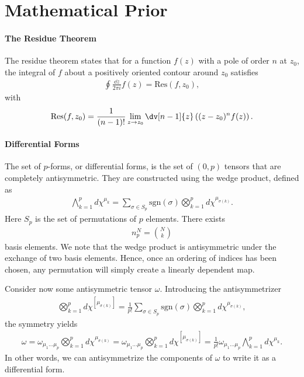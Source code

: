 \section{Mathematical Prior}

\paragraph{The Residue Theorem}
The residue theorem states that for a function $f(z)$ with a pole of order $n$ at $z_{0}$, the integral of $f$ about a positively oriented contour around $z_{0}$ satisfies
\begin{align*}
	\oint\frac{\dd{z}}{2\pi i}f(z) = \text{Res}(f, z_{0}),
\end{align*}
with
\begin{align*}
	\text{Res}(f, z_{0}) = \frac{1}{(n - 1)!}\lim\limits_{z\to z_{0}}\dv[n - 1]{z}\left((z - z_{0})^{n}f(z)\right).
\end{align*}

\paragraph{Differential Forms}
The set of $p$-forms, or differential forms, is the set of $(0, p)$ tensors that are completely antisymmetric. They are constructed using the wedge product, defined as
\begin{align*}
	\bigwedge\limits_{k = 1}^{p}d\chi^{\mu_{k}} = \sum\limits_{\sigma\in S_{p}}\text{sgn}(\sigma)\bigotimes_{k = 1}^{p}d\chi^{\mu_{\sigma(k)}}.
\end{align*}
Here $S_{p}$ is the set of permutations of $p$ elements. There exists
\begin{align*}
	n_{p}^{N} = {N\choose k}
\end{align*}
basis elements. We note that the wedge product is antisymmetric under the exchange of two basis elements. Hence, once an ordering of indices has been chosen, any permutation will simply create a linearly dependent map.

Consider now some antisymmetric tensor $\omega$. Introducing the antisymmetrizer
\begin{align*}
	\bigotimes_{k = 1}^{p}d\chi^{[\mu_{\sigma(k)}]} = \frac{1}{p!}\sum\limits_{\sigma\in S_{p}}\text{sgn}(\sigma)\bigotimes_{k = 1}^{p}d\chi^{\mu_{\sigma(k)}},
\end{align*}
the symmetry yields
\begin{align*}
	\omega = \omega_{\mu_{1}\dots \mu_{p}}\bigotimes_{k = 1}^{p}d\chi^{\mu_{\sigma(k)}} = \omega_{\mu_{1}\dots \mu_{p}}\bigotimes_{k = 1}^{p}d\chi^{[\mu_{\sigma(k)}]} = \frac{1}{p!}\omega_{\mu_{1}\dots \mu_{p}}\bigwedge\limits_{k = 1}^{p}d\chi^{\mu_{k}}.
\end{align*}
In other words, we can antisymmetrize the components of $\omega$ to write it as a differential form.

